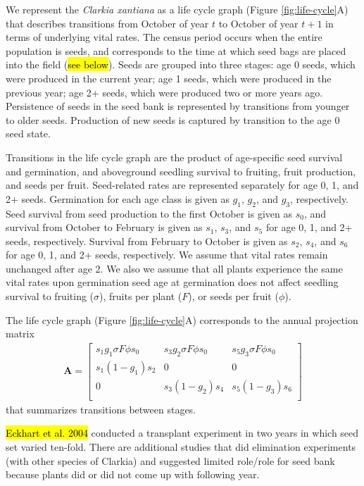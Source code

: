 \documentclass[12pt, oneside, titlepage]{article}   	%
\begin{document}
We represent the \textit{Clarkia xantiana} as a life cycle graph (Figure \ref{fig:life-cycle}A) that describes transitions from October of year $t$ to October of year $t+1$ in terms of underlying vital rates. The census period occurs when the entire population is seeds, and corresponds to the time at which seed bags are placed into the field (\hl{see below}). Seeds are grouped into three stages: age 0 seeds, which were produced in the current year; age 1 seeds, which were produced in the previous year; age 2+ seeds, which were produced two or more years ago. Persistence of seeds in the seed bank is represented by transitions from younger to older seeds. Production of new seeds is captured by transition to the age 0 seed state. 

Transitions in the life cycle graph are the product of age-specific seed survival and germination, and aboveground seedling survival to fruiting, fruit production, and seeds per fruit. Seed-related rates are represented separately for age 0, 1, and 2+ seeds. Germination for each age class is given as $g_1$, $g_2$, and $g_3$, respectively. Seed survival from seed production to the first October is given as $s_0$, and survival from October to February is given as $s_1$, $s_3$, and $s_5$ for age 0, 1, and 2+ seeds, respectively. Survival from February to October is given as $s_2$, $s_4$, and $s_6$ for age 0, 1, and 2+ seeds, respectively. We assume that vital rates remain unchanged after age 2. We also we assume that all plants experience the same vital rates upon germination seed age at germination does not affect seedling survival to fruiting ($\sigma$), fruits per plant ($F$), or seeds per fruit ($\phi$).

The life cycle graph (Figure \ref{fig:life-cycle}A) corresponds to the annual projection matrix
%
\begin{gather}
\bm{A} = 
\begin{bmatrix} 
s_1 g_1 \sigma F \phi s_0 & s_3 g_2 \sigma F \phi s_0 & s_5 g_3 \sigma F \phi s_0 \\
s_1 (1-g_1) s_2 & 0 & 0 \\
0 & s_3 (1-g_2) s_4  & s_5 (1-g_3) s_6  \\
\end{bmatrix}
\label{eq:projection-matrix}
\end{gather} 
%
that summarizes transitions between stages. 

\hl{Eckhart et al. 2004} conducted a transplant experiment in two years in which seed set varied ten-fold. There are additional studies that did elimination experiments (with other species of Clarkia) and suggested limited role/role for seed bank because plants did or did not come up with following year. 
\end{document}
